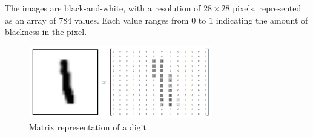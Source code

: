 \documentclass[a4paper]{article}
\begin{document}
The images are black-and-white, with a resolution of $28 \times 28$ pixels, represented as an array of $784$ values. Each value ranges from $0$ to $1$ indicating the amount of blackness in the pixel.

\begin{figure}[htb]
\centering
\includegraphics[width=8cm]{images/mnist-matrix.png}
\caption{Matrix representation of a digit}
\end{figure}


\newpage 


\end{document}
